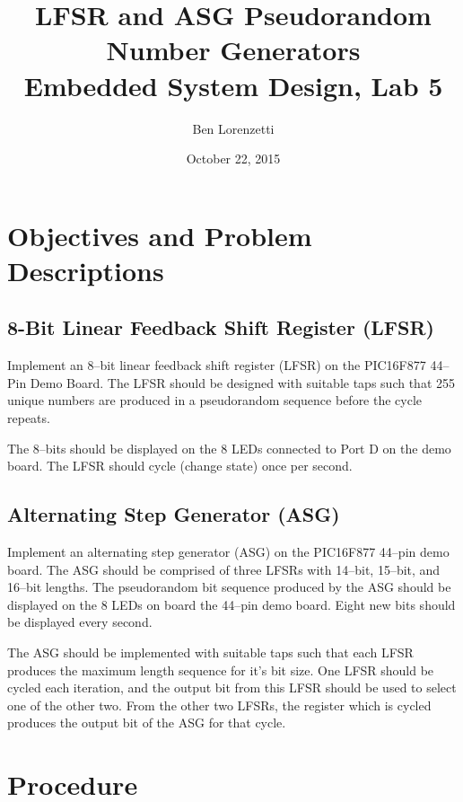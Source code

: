 \documentclass[11pt]{article}
\begin{document}
\title{LFSR and ASG Pseudorandom Number Generators\\Embedded System Design, Lab 5}
\date{October 22, 2015}
\author{Ben Lorenzetti}
\maketitle

\tableofcontents

\clearpage

\section{Objectives and Problem Descriptions}
\subsection{8-Bit Linear Feedback Shift Register (LFSR)}
\label{problem-1-specs}

Implement an 8--bit linear feedback shift register (LFSR) on the PIC16F877 44--Pin Demo Board.
The LFSR should be designed with suitable taps such that 255 unique numbers are produced in a
pseudorandom sequence before the cycle repeats.

The 8--bits should be displayed on the 8 LEDs connected to Port D on the demo board.
The LFSR should cycle (change state) once per second.

\subsection{Alternating Step Generator (ASG)}
\label{problem-2-spces}

Implement an alternating step generator (ASG) on the PIC16F877 44--pin demo board.
The ASG should be comprised of three LFSRs with 14--bit, 15--bit, and 16--bit
lengths. The pseudorandom bit sequence produced by the ASG should be displayed
on the 8 LEDs on board the 44--pin demo board. Eight new bits should be displayed
every second.

The ASG should be implemented with suitable taps such that each LFSR produces the
maximum length sequence for it's bit size. One LFSR should be cycled each iteration,
and the output bit from this LFSR should be used to select one of the other two.
From the other two LFSRs, the register which is cycled produces the output bit
of the ASG for that cycle.

\section{Procedure}
\end{document}
